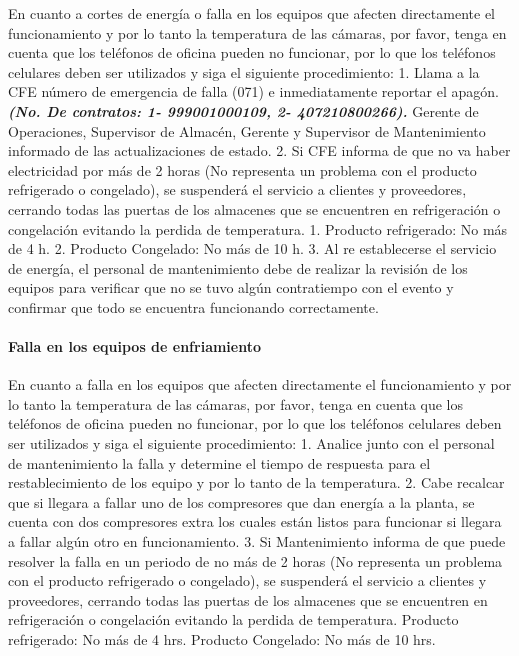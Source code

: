 En cuanto a cortes de energía o falla en los equipos que afecten directamente el funcionamiento y por lo tanto la temperatura de las cámaras, por favor, tenga en cuenta que los teléfonos de oficina pueden no funcionar, por lo que los teléfonos celulares deben ser utilizados y siga el siguiente procedimiento:
1.  Llama a la CFE número de emergencia de falla (071) e inmediatamente reportar el apagón. \emph{\textbf{(No. De contratos: 1- 999001000109, 2- 407210800266).}} Gerente de Operaciones, Supervisor de Almacén, Gerente y Supervisor de Mantenimiento informado de las actualizaciones de estado.
2. Si CFE informa de que no va haber electricidad por más de 2 horas (No representa un problema con el producto refrigerado o congelado), se suspenderá el servicio a clientes y proveedores, cerrando todas las puertas de los almacenes que se encuentren en refrigeración o congelación evitando la perdida de temperatura.
1.  Producto refrigerado: No más de 4 h.
2.  Producto Congelado: No más de 10 h.
3.  Al re establecerse el servicio de energía, el personal de mantenimiento debe de realizar la revisión de los equipos para verificar que no se tuvo algún contratiempo con el evento y confirmar que todo se encuentra funcionando correctamente.

\paragraph{Falla en los equipos de enfriamiento}

En cuanto a falla en los equipos que afecten directamente el funcionamiento y por lo tanto la temperatura de las cámaras, por favor, tenga en cuenta que los teléfonos de oficina pueden no funcionar, por lo que los teléfonos celulares deben ser utilizados y siga el siguiente procedimiento:
1. Analice junto con el personal de mantenimiento la falla y determine el tiempo de respuesta para el restablecimiento de los equipo y por lo tanto de la temperatura.
2. Cabe recalcar que si llegara a fallar uno de los compresores que dan energía a la planta, se cuenta con dos compresores extra los cuales están listos para funcionar si llegara a fallar algún otro en funcionamiento.
3. Si Mantenimiento informa de que puede resolver la falla en un periodo de no más de 2 horas (No representa un problema con el producto refrigerado o congelado), se suspenderá el servicio a clientes y proveedores, cerrando todas las puertas de los almacenes que se encuentren en refrigeración o congelación evitando la perdida de temperatura.
Producto refrigerado: No más de 4 hrs.
Producto Congelado: No más de 10 hrs.

